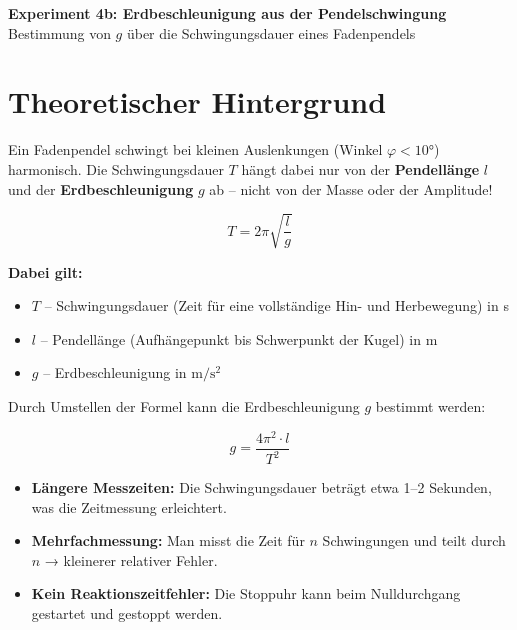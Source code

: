 \documentclass[11pt,a4paper]{scrartcl}
\begin{document}
	
	\begin{center}
		{\LARGE\bfseries Experiment 4b: Erdbeschleunigung aus der Pendelschwingung}\\[0.5cm]
		{\large Bestimmung von $g$ über die Schwingungsdauer eines Fadenpendels}
	\end{center}
	
	\vspace{0.5cm}
	
	\section*{Theoretischer Hintergrund}
	
	Ein Fadenpendel schwingt bei kleinen Auslenkungen (Winkel $\varphi < 10°$) harmonisch. Die Schwingungsdauer $T$ hängt dabei nur von der \textbf{Pendellänge} $l$ und der \textbf{Erdbeschleunigung} $g$ ab -- nicht von der Masse oder der Amplitude!
	
	\begin{formelbox}[title={\faIcon{square-root-alt} Schwingungsdauer des Fadenpendels}]
		\[T = 2\pi \sqrt{\frac{l}{g}}\]
		
		\textbf{Dabei gilt:}
		\begin{itemize}
			\item $T$ -- Schwingungsdauer (Zeit für eine vollständige Hin- und Herbewegung) in s
			\item $l$ -- Pendellänge (Aufhängepunkt bis Schwerpunkt der Kugel) in m
			\item $g$ -- Erdbeschleunigung in $\si{\metre\per\second\squared}$
		\end{itemize}
	\end{formelbox}
	
	Durch Umstellen der Formel kann die Erdbeschleunigung $g$ bestimmt werden:
	
	\begin{formelbox}[title={\faIcon{square-root-alt} Erdbeschleunigung aus der Schwingungsdauer}]
		\[g = \frac{4\pi^2 \cdot l}{T^2}\]
	\end{formelbox}
	
	\begin{infobox}[title={\faIcon{info-circle} Vorteile dieser Methode}]
		\begin{itemize}
			\item \textbf{Längere Messzeiten:} Die Schwingungsdauer beträgt etwa 1--2 Sekunden, was die Zeitmessung erleichtert.
			\item \textbf{Mehrfachmessung:} Man misst die Zeit für $n$ Schwingungen und teilt durch $n$ → kleinerer relativer Fehler.
			\item \textbf{Kein Reaktionszeitfehler:} Die Stoppuhr kann beim Nulldurchgang gestartet und gestoppt werden.
		\end{itemize}
	\end{infobox}
	
\end{document}
